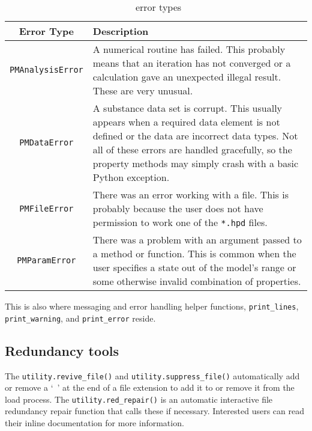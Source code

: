 \begin{table}
\caption{\PM\ error types}\label{tab:errors}
\begin{tabular}{|cp{2.5in}|}
\hline
Error Type & Description\\
\hline
\texttt{PMAnalysisError} & A numerical routine has failed. This probably means that an iteration has not converged or a calculation gave an unexpected illegal result.  These are very unusual.\\
\texttt{PMDataError} & A substance data set is corrupt. This usually appears when a required data element is not defined or the data are incorrect data types.  Not all of these errors are handled gracefully, so the property methods may simply crash with a basic Python exception.\\
\texttt{PMFileError} & There was an error working with a file. This is probably because the user does not have permission to work one of the \texttt{*.hpd} files.\\
\texttt{PMParamError} & There was a problem with an argument passed to a method or function. This is common when the user specifies a state out of the model's range or some otherwise invalid combination of properties.\\
\hline
\end{tabular}
\end{table}

This is also where messaging and error handling helper functions, \verb|print_lines|, \verb|print_warning|, and \verb|print_error| reside.

\subsection{Redundancy tools}

The \verb|utility.revive_file()| and \verb|utility.suppress_file()| automatically add or remove a `~' at the end of a file extension to add it to or remove it from the load process.  The \verb|utility.red_repair()| is an automatic interactive file redundancy repair function that calls these if necessary.  Interested users can read their inline documentation for more information.
